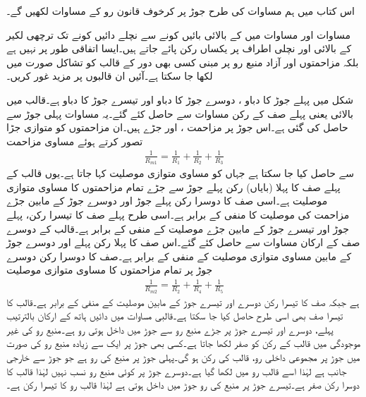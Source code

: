 اس کتاب میں ہم مساوات  کی طرح جوڑ پر کرخوف قانون رو کے مساوات لکھیں گے۔

مساوات  اور مساوات  میں    کے بالائی بائیں کونے سے نچلے دائیں کونے تک ترچھی لکیر کے بالائی اور نچلی اطراف پر یکساں رکن پائے جاتے ہیں۔ایسا اتفاقی طور پر نہیں ہے  بلکہ مزاحمتوں اور آزاد منبع رو پر مبنی کسی بھی دور کے  قالب کو تشاکل صورت میں لکھا جا سکتا ہے۔آئیں ان قالبوں پر مزید غور کریں۔

شکل  میں پہلے جوڑ کا دباو ، دوسرے  جوڑ کا دباو  اور تیسرے جوڑ کا دباو  ہے۔قالب میں بالائی یعنی پہلے صف کے رکن مساوات  سے حاصل کئے گئے۔یہ مساوات پہلی جوڑ سے حاصل کی گئی ہے۔اس جوڑ پر مزاحمت ،  اور  جڑے ہیں۔ان مزاحمتوں کو متوازی جڑا تصور کرتے ہوئے مساوی مزاحمت 
\begin{align*}
\frac{1}{R_{m1}}=\frac{1}{R_1}+\frac{1}{R_2}+\frac{1}{R_3}
\end{align*}
سے حاصل کیا جا سکتا ہے جہاں  کو مساوی متوازی موصلیت  کہا جاتا ہے۔یوں  قالب کے پہلے صف کا پہلا (بایاں) رکن  پہلے جوڑ سے  جڑے تمام مزاحمتوں کا مساوی متوازی موصلیت   ہے۔اسی صف کا دوسرا رکن  پہلے جوڑ اور دوسرے جوڑ کے مابین جڑے مزاحمت کی موصلیت کا منفی  کے برابر ہے۔اسی طرح پہلے صف کا تیسرا رکن، پہلے جوڑ اور تیسرے جوڑ کے مابین جڑے موصلیت کے منفی  کے برابر ہے۔قالب کے دوسرے صف کے ارکان مساوات  سے حاصل کئے گئے۔اس صف کا پہلا رکن پہلے اور دوسرے جوڑ کے مابین مساوی متوازی موصلیت کے منفی  کے برابر ہے۔صف کا دوسرا رکن دوسرے جوڑ پر تمام مزاحمتوں کا مساوی متوازی موصلیت 
\begin{align*}
\frac{1}{R_{m2}}=\frac{1}{R_2}+\frac{1}{R_4}+\frac{1}{R_5}
\end{align*}
ہے جبکہ صف کا تیسرا رکن دوسرے اور تیسرے جوڑ کے مابین موصلیت کے منفی  کے برابر ہے۔قالب کا تیسرا صف بھی اسی طرح حاصل کیا جا سکتا ہے۔قالبی مساوات میں دائیں ہاتھ  کے ارکان بالترتیب پہلے، دوسرے اور تیسرے جوڑ پر جڑے منبع رو سے جوڑ میں داخل ہوتی رو ہے۔منبع رو کی غیر موجودگی میں قالب کے رکن کو صفر لکھا جاتا ہے۔کسی بھی جوڑ پر ایک سے زیادہ منبع رو کی صورت میں جوڑ پر مجموعی داخلی رو، قالب کی رکن ہو گی۔پہلی جوڑ پر منبع کی رو  ہے جو جوڑ سے خارجی جانب ہے لہٰذا اسے قالب رو میں  لکھا گیا ہے۔دوسرے جوڑ پر کوئی منبع رو نسب نہیں لہٰذا قالب کا دوسرا رکن صفر ہے۔تیسرے جوڑ پر منبع  کی رو جوڑ میں داخل ہوتی ہے لہٰذا قالب رو کا تیسرا رکن  ہے۔ 

